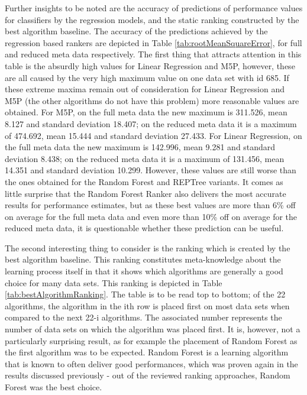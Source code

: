 Further insights to be noted are the accuracy of predictions of performance values for classifiers by the regression models, and the static ranking constructed by the best algorithm baseline. The accuracy of the predictions achieved by the regression based rankers are depicted in Table \ref{tab:rootMeanSquareError}, for full and reduced meta data respectively. The first thing that attracts attention in this table is the absurdly high values for Linear Regression and M5P, however, these are all caused by the very high maximum value on one data set with id 685. If these extreme maxima remain out of consideration for Linear Regression and M5P (the other algorithms do not have this problem) more reasonable values are obtained. For M5P, on the full meta data the new maximum is 311.526, mean 8.127 and standard deviation 18.407; on the reduced meta data it is a maximum of 474.692, mean 15.444 and standard deviation 27.433. For Linear Regression, on the full meta data the new maximum is 142.996, mean 9.281 and standard deviation 8.438; on the reduced meta data it is a maximum of 131.456, mean 14.351 and standard deviation 10.299. However, these values are still worse than the ones obtained for the Random Forest and REPTree variants. It comes as little surprise that the Random Forest Ranker also delivers the most accurate results for performance estimates, but as these best values are more than 6\% off on average for the full meta data and even more than 10\% off on average for the reduced meta data, it is questionable whether these prediction can be useful.



The second interesting thing to consider is the ranking which is created by the best algorithm baseline. This ranking constitutes meta-knowledge about the learning process itself in that it shows which algorithms are generally a good choice for many data sets. This ranking is depicted in Table \ref{tab:bestAlgorithmRanking}. The table is to be read top to bottom; of the 22 algorithms, the algorithm in the ith row is placed first on most data sets when compared to the next 22-i algorithms. The associated number represents the number of data sets on which the algorithm was placed first. It is, however, not a particularly surprising result, as for example the placement of Random Forest as the first algorithm was to be expected. Random Forest is a learning algorithm that is known to often deliver good performances, which was proven again in the results discussed previously - out of the reviewed ranking approaches, Random Forest was the best choice.










